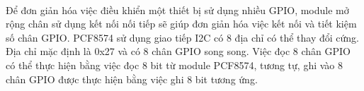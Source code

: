 \paragraph{}
Để đơn giản hóa việc điều khiển một thiết bị sử dụng nhiều GPIO, module mở rộng chân sử dụng kết nối nối tiếp sẽ giúp đơn giản hóa việc kết nối và tiết kiệm số chân GPIO. PCF8574 sử dụng giao tiếp I2C có 8 địa chỉ có thể thay đổi cứng. Địa chỉ mặc định là 0x27 và có 8 chân GPIO song song. Việc đọc 8 chân GPIO có thể thực hiện bằng việc đọc 8 bit từ module PCF8574, tương tự, ghi vào 8 chân GPIO được thực hiện bằng việc ghi 8 bit tương ứng.
